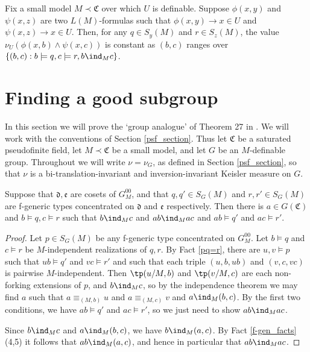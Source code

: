 \documentclass[10pt]{article}
\begin{document}
{\begin{fact}\label{indep_reals_const}
Fix a small model $M\prec\mathfrak{C}$ over which $U$ is definable. Suppose $\phi(x,y)$ and $\psi(x,z)$ are two $L(M)$-formulas such that $\phi(x,y)\to x\in U$ and $\psi(x,z)\to x\in U$. Then, for any $q\in S_y(M)$ and $r\in S_z(M)$, the value $\nu_U(\phi(x,b)\wedge\psi(x,c))$ is constant as $(b,c)$ ranges over $\{(b,c):b\models q,c\models r,b\ind_M c\}$.
\end{fact}



\section{Finding a good subgroup}\label{infinitary_section}
In this section we will prove the `group analogue' of Theorem 27 in \citep{tao}. We will work with the conventions of Section \ref{psf_section}. Thus let $\mathfrak{C}$ be a saturated pseudofinite field, let $M\prec\mathfrak{C}$ be a small model, and let $G$ be an $M$-definable group. Throughout we will write $\nu=\nu_G$, as defined in Section \ref{psf_section}, so that $\nu$ is a bi-translation-invariant and inversion-invariant Keisler measure on $G$.

\begin{lemma}\label{pqr strong}
Suppose that $\mathfrak{d},\mathfrak{e}$ are cosets of $G^{00}_M$, and that $q,q'\in S_G(M)$ and $r,r'\in S_G(M)$ are f-generic types concentrated on $\mathfrak{d}$ and $\mathfrak{e}$ respectively. Then there is $a\in G(\mathfrak{C})$ and $b\models q,c\models r$ such that $b\ind_M c$ and $ab\ind_M ac$ and $ab\models q'$ and $ac\models r'$.
\end{lemma}
\begin{proof}
    Let $p\in S_G(M)$ be any f-generic type concentrated on $G^{00}_M$. Let $b\models q$ and $c\models r$ be $M$-independent realizations of $q,r$. By Fact \ref{pq=r}, there are $u,v\models p$ such that $ub\models q'$ and $vc\models r'$ and such that each triple $(u,b,ub)$ and $(v,c,vc)$ is pairwise $M$-independent. Then $\tp(u/M,b)$ and $\tp(v/M,c)$ are each non-forking extensions of $p$, and $b\ind_M c$, so by the independence theorem we may find $a$ such that $a\equiv_{(M,b)}u$ and $a\equiv_{(M,c)}v$ and $a\ind_M(b,c)$. By the first two conditions, we have $ab\models q'$ and $ac
    \models r'$, so we just need to show $ab\ind_M ac$.

    Since $b\ind_M c$ and $a\ind_M(b,c)$, we have $b\ind_M(a,c)$. By Fact \ref{f-gen_facts}(4,5) it follows that $ab\ind_M(a,c)$, and hence in particular that $ab\ind_M ac$.
\end{proof}

}
\end{document}
